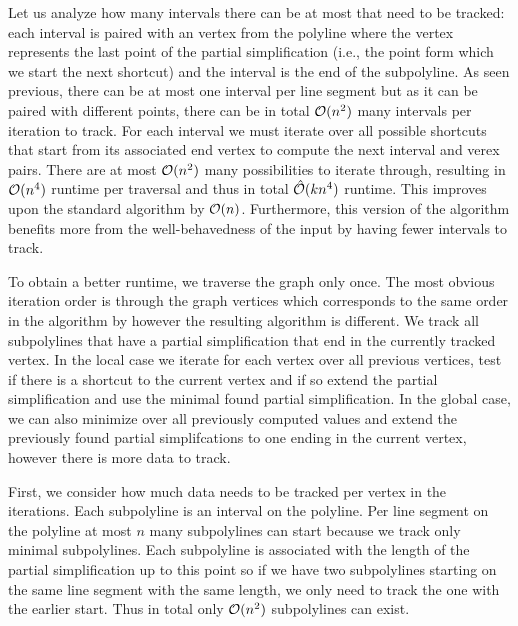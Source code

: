 Let us analyze how many intervals there can be at most that need to be tracked: each interval is paired with an vertex from the polyline where the vertex represents the last point of the partial simplification (i.e., the point form which we start the next shortcut) and the interval is the end of the subpolyline. As seen previous, there can be at most one interval per line segment but as it can be paired with different points, there can be in total \(\mathcal{O}(n^2)\) many intervals per iteration to track. For each interval we must iterate over all possible shortcuts that start from its associated end vertex to compute the next interval and verex pairs. There are at most \(\mathcal{O}(n^2)\) many possibilities to iterate through, resulting in \(\mathcal{O}(n^4)\) runtime per traversal and thus in total \(\hat{\mathcal{O}}(kn^4)\) runtime. This improves upon the standard algorithm by \(\mathcal{O}(n)\). Furthermore, this version of the algorithm benefits more from the well-behavedness of the input by having fewer intervals to track.

To obtain a better runtime, we traverse the graph only once. The most obvious iteration order is through the graph vertices which corresponds to the same order in the algorithm by \citeauthor{polyline_simplification_has_cubic_complexity_bringmannetal} however the resulting algorithm is different. We track all subpolylines that have a partial simplification that end in the currently tracked vertex. In the local case we iterate for each vertex over all previous vertices, test if there is a shortcut to the current vertex and if so extend the partial simplification and use the minimal found partial simplification. In the global case, we can also minimize over all previously computed values and extend the previously found partial simplifcations to one ending in the current vertex, however there is more data to track.

First, we consider how much data needs to be tracked per vertex in the iterations. Each subpolyline is an interval on the polyline. Per line segment on the polyline at most \(n\) many subpolylines can start because we track only minimal subpolylines. Each subpolyline is associated with the length of the partial simplification up to this point so if we have two subpolylines starting on the same line segment with the same length, we only need to track the one with the earlier start. Thus in total only \(\mathcal{O}(n^2)\) subpolylines can exist.

